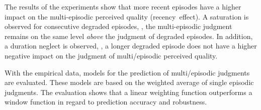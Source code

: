 The results of the experiments show that more recent episodes have a higher impact on the multi-episodic perceived quality (recency~effect). 
A saturation is observed for consecutive degraded episodes, \ie, the multi-episodic judgment remains on the same level \emph{above} the judgment of degraded episodes.
In addition, a duration neglect is observed, \ie, a longer degraded episode does not have a higher negative impact on the judgment of multi\-/episodic perceived quality. 


With the empirical data, models for the prediction of multi\-/episodic judgments are evaluated.
These models are based on the weighted average of single episodic judgments.
The evaluation shows that a linear weighting function outperforms a window function in regard to prediction accuracy and robustness.


